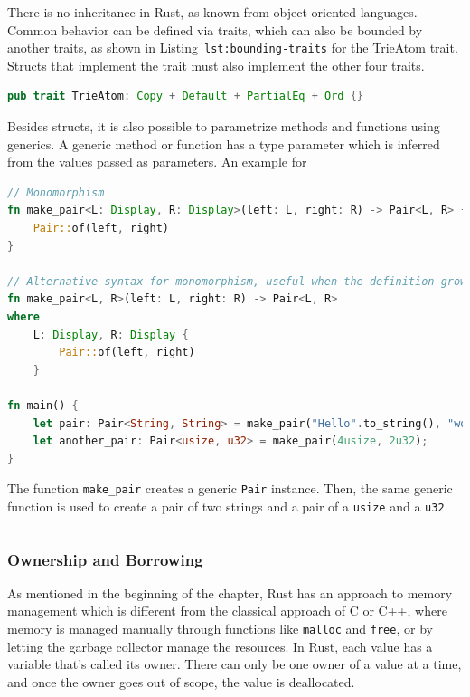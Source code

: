 \documentclass{article}
\begin{document}
There is no inheritance in Rust, as known from object-oriented languages. Common behavior can be defined via traits, which can also be bounded by another traits, as shown in Listing~\lstinline{lst:bounding-traits} for the TrieAtom trait. Structs that implement the trait must also implement the other four traits.
\begin{lstlisting}[language=Rust, style=boxed, caption=An example trait from the \textit{trying} crate which we evaluate the approach on, label=lst:bounding-traits]
pub trait TrieAtom: Copy + Default + PartialEq + Ord {}
\end{lstlisting}

Besides structs, it is also possible to parametrize methods and functions using generics. A generic method or function has a type parameter which is inferred from the values passed as parameters. An example for
\begin{lstlisting}[language=Rust, style=boxed, caption=Variants of defining a generic function, label=lst:example-generic-functions]
// Monomorphism
fn make_pair<L: Display, R: Display>(left: L, right: R) -> Pair<L, R> {
    Pair::of(left, right)
}

// Alternative syntax for monomorphism, useful when the definition grows large
fn make_pair<L, R>(left: L, right: R) -> Pair<L, R>
where
    L: Display, R: Display {
        Pair::of(left, right)
    }

fn main() {
    let pair: Pair<String, String> = make_pair("Hello".to_string(), "world".to_string());
    let another_pair: Pair<usize, u32> = make_pair(4usize, 2u32);
}
\end{lstlisting}
The function \lstinline{make_pair} creates a generic \lstinline{Pair} instance. Then, the same generic function is used to create a pair of two strings and a pair of a \lstinline{usize} and a \lstinline{u32}.

\begin{lstlisting}[language=Rust, style=boxed, caption=A function which will remain generic at runtime. It can be rewritten in the same stly as the other two variants in Listing~\ref{lst:example-generic-functions}, label=lst:example-dyn-generic-function]

\end{lstlisting}

\subsubsection{Ownership and Borrowing}
As mentioned in the beginning of the chapter, Rust has an approach to memory management which is different from the classical approach of C or C++, where memory is managed manually through functions like \lstinline{malloc} and \lstinline{free}, or by letting the garbage collector manage the resources. In Rust, each value has a variable that's called its owner. There can only be one owner of a value at a time, and once the owner goes out of scope, the value is deallocated.
\end{document}
